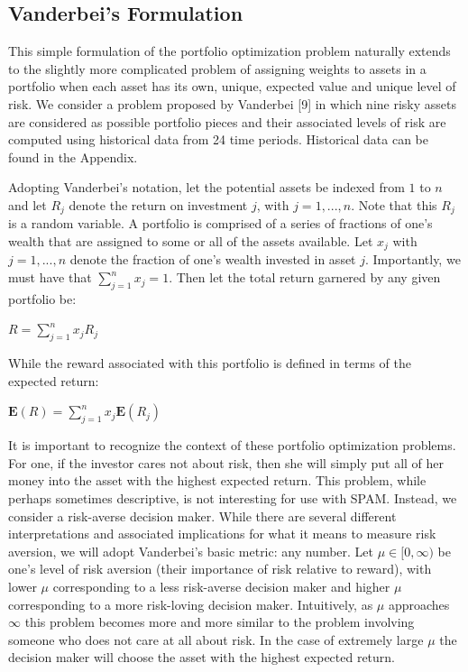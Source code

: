 \documentclass{article}
\begin{document}
\subsection{Vanderbei's Formulation}
This simple formulation of the portfolio optimization problem naturally extends to the slightly more complicated problem of assigning weights to assets in a portfolio when each asset has its own, unique, expected value and unique level of risk. We consider a problem proposed by Vanderbei [9] in which nine risky assets are considered as possible portfolio pieces and their associated levels of risk are computed using historical data from 24 time periods. Historical data can be found in the Appendix. 

Adopting Vanderbei's notation, let the potential assets be indexed from $1$ to $n$ and let $R_j$ denote the return on investment $j$, with $j = 1,...,n$. Note that this $R_j$ is a random variable. A portfolio is comprised of a series of fractions of one's wealth that are assigned to some or all of the assets available. Let $x_j$ with $j = 1,...,n$ denote the fraction of one's wealth invested in asset $j$. Importantly, we must have that $\sum_{j=1}^{n} x_j = 1$. Then let the total return garnered by any given portfolio be:

\begin{center}
    $R = \sum_{j=1}^{n} x_jR_j$
\end{center}

While the reward associated with this portfolio is defined in terms of the expected return:

\begin{center}
    $\mathbf{E}(R) = \sum_{j=1}^{n} x_j\mathbf{E}(R_j)$
\end{center}

It is important to recognize the context of these portfolio optimization problems. For one, if the investor cares not about risk, then she will simply put all of her money into the asset with the highest expected return. This problem, while perhaps sometimes descriptive, is not interesting for use with SPAM. Instead, we consider a risk-averse decision maker. While there are several different interpretations and associated implications for what it means to measure risk aversion, we will adopt Vanderbei's basic metric: any number. Let $\mu \in [0,\infty)$ be one's level of risk aversion (their importance of risk relative to reward), with lower $\mu$ corresponding to a less risk-averse decision maker and higher $\mu$ corresponding to a more risk-loving decision maker. Intuitively, as $\mu$ approaches $\infty$ this problem becomes more and more similar to the problem involving someone who does not care at all about risk. In the case of extremely large $\mu$ the decision maker will choose the asset with the highest expected return. 
\end{document}
